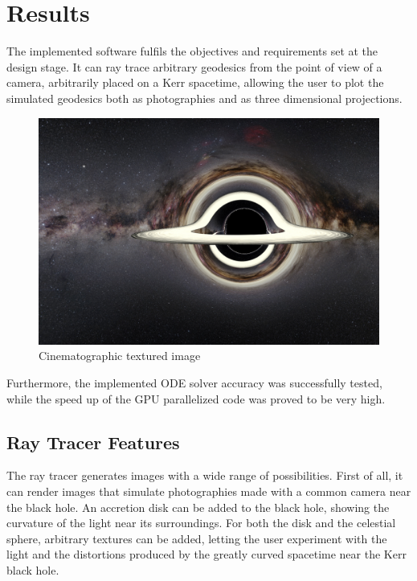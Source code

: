 \chapter{Results}

The implemented software fulfils the objectives and requirements set at the design stage. It can ray trace arbitrary geodesics from the point of view of a camera, arbitrarily placed on a Kerr spacetime, allowing the user to plot the simulated geodesics both as photographies and as three dimensional projections.

\begin{figure}[bth]
	\myfloatalign
	\includegraphics[width=\linewidth]{gfx/bh_texture_disk}
	\caption[Cinematographic textured image]{Cinematographic textured image}
	\label{fig:blackhole}
\end{figure}

Furthermore, the implemented \ac{ODE} solver accuracy was successfully tested, while the speed up of the \ac{GPU} parallelized code was proved to be very high.

\section{Ray Tracer Features}

The ray tracer generates images with a wide range of possibilities. First of all, it can render images that simulate photographies made with a common camera near the black hole. An accretion disk can be added to the black hole, showing the curvature of the light near its surroundings. For both the disk and the celestial sphere, arbitrary textures can be added, letting the user experiment with the light and the distortions produced by the greatly curved spacetime near the Kerr black hole.

